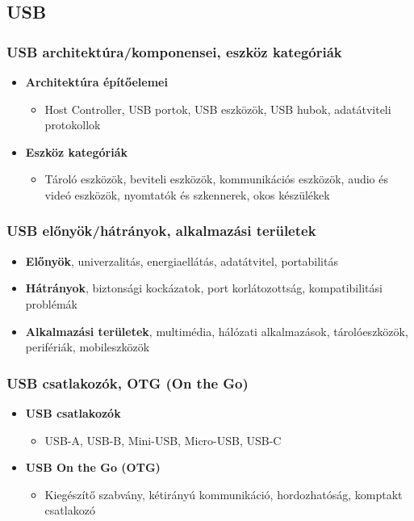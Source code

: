 \subsection{USB}
\subsubsection{USB architektúra/komponensei, eszköz kategóriák}
\begin{itemize}
    \item \textbf{Architektúra építőelemei}
    \begin{itemize}
        \item Host Controller, USB portok, USB eszközök, USB hubok, adatátviteli protokollok
    \end{itemize}
    \item \textbf{Eszköz kategóriák}
    \begin{itemize}
        \item Tároló eszközök, beviteli eszközök, kommunikációs eszközök, audio és videó eszközök, nyomtatók és szkennerek, okos készülékek
    \end{itemize}
\end{itemize}

\clearpage
\subsubsection{USB előnyök/hátrányok, alkalmazási területek}
\begin{itemize}
    \item \textbf{Előnyök}, univerzalitás, energiaellátás, adatátvitel, portabilitás
    \item \textbf{Hátrányok}, biztonsági kockázatok, port korlátozottság, kompatibilitási problémák
    \item \textbf{Alkalmazási területek}, multimédia, hálózati alkalmazások, tárolóeszközök, perifériák, mobileszközök
\end{itemize}

\subsubsection{USB csatlakozók, OTG (On the Go)}
\begin{itemize}
    \item \textbf{USB csatlakozók}
    \begin{itemize}
        \item USB-A, USB-B, Mini-USB, Micro-USB, USB-C
    \end{itemize}
    \item \textbf{USB On the Go (OTG)}
    \begin{itemize}
        \item Kiegészítő szabvány, kétirányú kommunikáció, hordozhatóság, komptakt csatlakozó
    \end{itemize}
\end{itemize}

